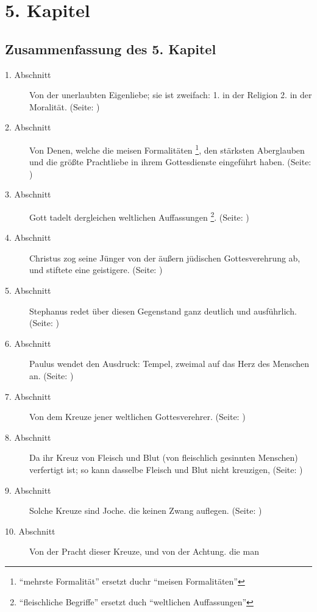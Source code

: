 


\chapter{5. Kapitel} \label{kap5}

\section{Zusammenfassung des 5. Kapitel}
\footnotesize
\begin{description}
\item[1. Abschnitt] Von der unerlaubten Eigenliebe; sie ist zweifach: 1. in der
Religion  2. in der Moralität. (Seite: \pageref{kap5_ab1})
\item[2. Abschnitt] Von Denen, welche die meisen Formalitäten
\footnote{"`mehrste Formalität"' ersetzt duchr "`meisen Formalitäten"'}, den
stärksten
Aberglauben und die größte Prachtliebe in ihrem Gottesdienste eingeführt haben.
(Seite: \pageref{kap5_ab2})
\item[3. Abschnitt] Gott tadelt dergleichen weltlichen Auffassungen
\footnote{"`fleischliche Begriffe"' ersetzt duch "`weltlichen Auffassungen"'}.
(Seite:
\pageref{kap5_ab3})
\item[4. Abschnitt] Christus zog seine Jünger von der äußern jüdischen
Gottesverehrung ab, und stiftete eine geistigere. (Seite: \pageref{kap5_ab4})
\item[5. Abschnitt] Stephanus redet über diesen Gegenstand ganz deutlich und
ausführlich. (Seite: \pageref{kap5_ab5})
\item[6. Abschnitt] Paulus wendet den Ausdruck: Tempel, zweimal auf das Herz des
Menschen an. (Seite: \pageref{kap5_ab6})
\item[7. Abschnitt] Von dem Kreuze jener weltlichen Gottesverehrer. (Seite:
\pageref{kap5_ab7})
\item[8. Abschnitt] Da ihr Kreuz von Fleisch und Blut (von fleischlich gesinnten
Menschen) verfertigt ist; so kann dasselbe Fleisch und Blut nicht kreuzigen,
(Seite: \pageref{kap5_ab8})
\item[9. Abschnitt] Solche Kreuze sind Joche. die keinen Zwang auflegen. (Seite:
\pageref{kap5_ab9})
\item[10. Abschnitt] Von der Pracht dieser Kreuze, und von der Achtung. die man

\end{description}
